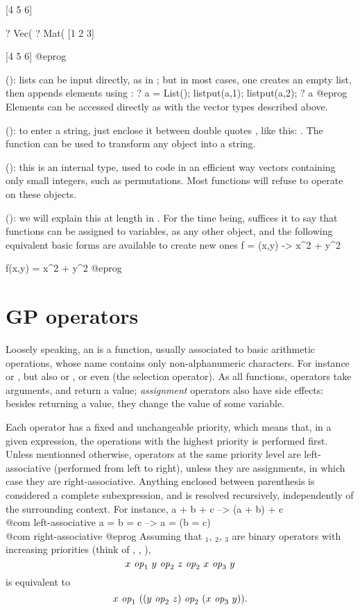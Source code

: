 [4 5 6]

? Vec(%
? Mat(%
[1 2 3]

[4 5 6]
@eprog

 (): lists can be input
directly, as in ; but in most cases, one creates
an empty list, then appends elements using :
\bprog
  ? a = List(); listput(a,1); listput(a,2);
  ? a
@eprog\noindent
Elements can be accessed directly as with the vector types described above.

 (): to
enter a string, just enclose it between double quotes , like this:
. The function  can be used to transform any
object into a string.

 (): this is an internal type,
used to code in an efficient way vectors containing only small integers, such
as permutations. Most  functions will refuse to operate on these
objects.

 (): we will explain this at length in
. For the time being, suffices it to say that
functions can be assigned to variables, as any other object, and the
following equivalent basic forms are available to create new ones
\bprog
  f = (x,y) -> x^2 + y^2

  f(x,y) = x^2 + y^2
@eprog

\section{GP operators}\label{se:operators}

\noindent Loosely speaking, an  is a function, usually
associated to basic arithmetic operations, whose name contains only
non-alphanumeric characters. For instance \kbd{+} or \kbd{-}, but also
\kbd{=} or \kbd{+=}, or even \kbd{[ ]} (the selection operator). As all
functions, operators take arguments, and return a value; \emph{assignment}
operators also have side effects: besides returning a value, they change the
value of some variable.

Each operator has a fixed and unchangeable priority, which means that, in
a given expression, the operations with the highest priority is performed
first. Unless mentionned otherwise, operators at the same priority level are
left-associative (performed from left to right), unless they are assignments,
in which case they are right-associative. Anything enclosed between
parenthesis is considered a complete subexpression, and is resolved
recursively, independently of the surrounding context. For instance,
\bprog
  a + b + c    -->   (a + b) + c     \\@com left-associative
  a = b = c    -->   a = (b = c)     \\@com right-associative
@eprog\noindent
Assuming that $_1$, $_2$, $_3$ are
binary operators with increasing priorities (think of \kbd{+},
\kbd{*}, \kbd{\pow}),
$$ x~\hbox{\it op\/}_1~y~\hbox{\it op\/}_2~z~\hbox{\it op\/}_2~x~\hbox{\it op\/}_3~y $$ is
equivalent to $$ x~\hbox{\it op\/}_1~((y~\hbox{\it op\/}_2~z)~\hbox{\it op\/}_2~
(x~\hbox{\it op\/}_3~y)).$$

